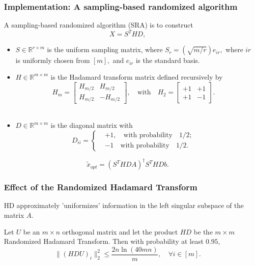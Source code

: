 \subsubsection{Implementation: A sampling-based randomized algorithm}
A sampling-based randomized algorithm (SRA) is to construct
$$
X = S^T H D,
$$

\begin{itemize}
	\item $S \in \mathbb{R}^{r \times m}$ is the uniform sampling matrix, where $S_{r} = (\sqrt{m/r}) e_{ir},$ where $ir$ is uniformly chosen from $[m],$
	and $e_{ir}$ is the standard basis. \\
	\item $H \in \mathbb{R}^{m \times m}$ is the Hadamard transform matrix defined recursively by
	$$
	H_m = \begin{bmatrix} H_{m/2} & H_{m/2} \\ H_{m/2} & -H_{m/2} \end{bmatrix}, \quad \text{with} \quad H_2 = \begin{bmatrix} +1 & +1 \\ +1 & -1 \end{bmatrix}.
	$$\\
	\item $D \in \mathbb{R}^{m \times m}$ is the diagonal matrix with
	$$
	D_{ii} = \begin{cases} &+1, \quad \text{with probability} \quad 1/2;\\ &-1 \quad \text{with probability} \quad 1/2. \end{cases}
	$$
\end{itemize}

$$
\tilde{x}_{opt} = (S^T H D A)^{\dagger} S^T H D b.
$$

\subsubsection{Effect of the Randomized Hadamard Transform}
{\color{red} HD approximately 'uniformizes' information in the left singular subspace of the matrix $A$.}
\begin{lemma}
	Let $U$ be an $m \times n$ orthogonal matrix and let the product $HD$ be the $m \times m$ Randomized Hadamard Transform. Then with probability at least $0.95$,
	$$
	\| (HDU)_{i} \|_2^2 \leq \frac{2n \ln(40 m n)}{m}, \quad \forall i \in [m].
	$$
\end{lemma}

